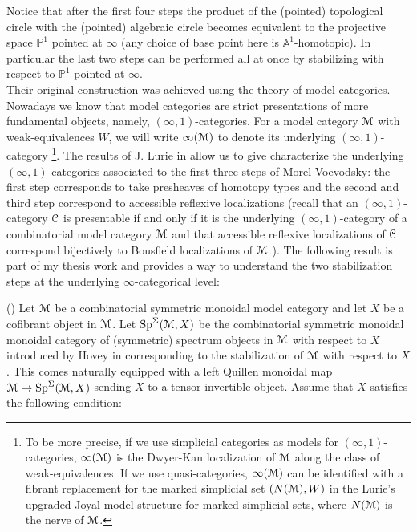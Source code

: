 \begin{refsection}
Notice that after the first four steps the product of the (pointed) topological circle with the (pointed) algebraic circle becomes equivalent to the projective space $\mathbb{P}^1$ pointed at $\infty$ (any choice of base point here is $\mathbb{A}^1$-homotopic). In particular the last two steps can be performed all at once by stabilizing with respect to  $\mathbb{P}^1$ pointed at $\infty$.\\ 

Their original construction was achieved using the theory of model categories. Nowadays we know that model categories are strict presentations of more fundamental objects, namely, $(\infty,1)$-categories. For a model category $\mathcal{M}$ with weak-equivalences $W$, we will write $\infty(\mathcal{M})$ to denote its underlying $(\infty,1)$-category \footnote{To be more precise, if we use simplicial categories as models for $(\infty,1)$-categories, $\infty(\mathcal{M})$ is the Dwyer-Kan localization of $\mathcal{M}$ along the class of weak-equivalences. If we use quasi-categories, $\infty(\mathcal{M})$ can be identified with a fibrant replacement for the marked simplicial set $(N(\mathcal{M}), W)$ in the Lurie's upgraded Joyal model structure for marked simplicial sets, where $N(\mathcal{M})$ is the nerve of $\mathcal{M}$.}.  The results of J. Lurie in \cite{htt} allow us to give characterize the underlying $(\infty,1)$-categories associated to the first three steps of Morel-Voevodsky: the first step corresponds to take presheaves of homotopy types \cite[4.2.4.4]{htt} and the second and third step correspond to accessible reflexive localizations (recall that an $(\infty,1)$-category $\mathcal{C}$ is presentable if and only if it is the underlying $(\infty,1)$-category of a combinatorial model category $\mathcal{M}$ and that accessible reflexive localizations of $\mathcal{C}$ correspond bijectively to Bousfield localizations of $\mathcal{M}$ \cite[A.3.7.4, A.3.7.6, A.3.7.8]{htt}). The following result is part of my thesis work and provides a way to understand the two stabilization steps at the underlying $\infty$-categorical level:


\begin{thm}(\cite[4.29]{nc1})
Let $\mathcal{M}$ be a combinatorial symmetric monoidal model category and let $X$ be a cofibrant object in $\mathcal{M}$. Let $\mathrm{Sp}^{\Sigma}(\mathcal{M}, X)$ be the combinatorial symmetric monoidal monoidal category of (symmetric) spectrum objects in $\mathcal{M}$ with respect to $X$ introduced by Hovey in \cite{hovey-spectraandsymmetricspectra} corresponding to the stabilization of $\mathcal{M}$ with respect to $X$. This comes naturally equipped with a left Quillen monoidal map $\mathcal{M}\to \mathrm{Sp}^{\Sigma}(\mathcal{M}, X)$ sending $X$ to a tensor-invertible object. Assume that $X$ satisfies the following condition:\\


\end{thm}
\end{refsection}
